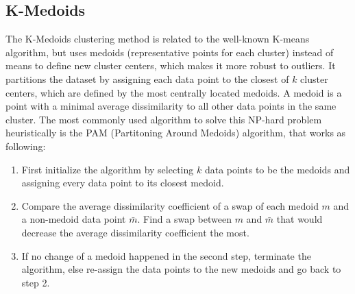 \subsection{K-Medoids}
The K-Medoids clustering method is related to the well-known K-means algorithm, but uses medoids (representative points for each cluster) instead of means to define new cluster centers, which makes it more robust to outliers. It partitions the dataset by assigning each data point to the closest of $k$ cluster centers, which are defined by the most centrally located medoids. A medoid is a point with a minimal average dissimilarity to all other data points in the same cluster. The most commonly used algorithm to solve this NP-hard problem heuristically is the PAM (Partitoning Around Medoids) algorithm, that works as following: \\
\begin{enumerate}
	\item First initialize the algorithm by selecting $k$ data points to be the medoids and assigning every data point to its closest medoid. \\
	\item Compare the average dissimilarity coefficient of a swap of each medoid $m$ and a non-medoid data point $\bar{m}$. Find a swap between $m$ and $\bar{m}$ that would decrease the average dissimilarity coefficient the most. 
	\item If no change of a medoid happened in the second step, terminate the algorithm, else re-assign the data points to the new medoids and go back to step 2. 
\end{enumerate}